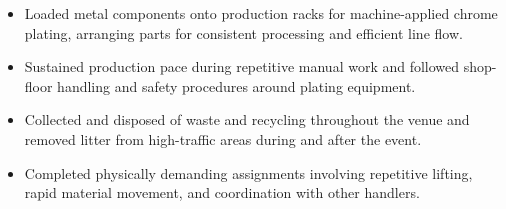 \begin{itemize}
  \item Loaded metal components onto production racks for machine-applied chrome plating, arranging parts for consistent processing and efficient line flow.
  \item Sustained production pace during repetitive manual work and followed shop-floor handling and safety procedures around plating equipment.
\end{itemize}

\begin{itemize}
  \item Collected and disposed of waste and recycling throughout the venue and removed litter from high-traffic areas during and after the event.
\end{itemize}

\begin{itemize}
  \item Completed physically demanding assignments involving repetitive lifting, rapid material movement, and coordination with other handlers.
\end{itemize}
